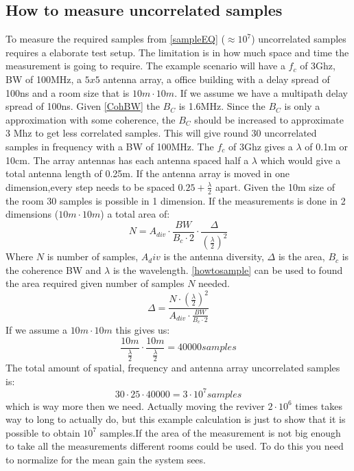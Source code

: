 \subsection{How to measure uncorrelated samples}
To measure the required samples from \autoref{sampleEQ} ($\approx 10^7$) uncorrelated samples requires a elaborate test setup. The limitation is in how much space and time the measurement is going to require. The example scenario  will have a $f_c$ of 3Ghz, BW of 100MHz, a $5x5$ antenna array, a office building with a delay spread of 100ns and a room size that is $10m \cdot 10m$.
If we assume we have a multipath delay spread of 100ns. Given \autoref{CohBW} the $B_C$ is 1.6MHz. Since the $B_C$ is only a approximation with some coherence, the $B_C$ should be increased to approximate 3 Mhz to get less correlated samples. This will give round 30 uncorrelated samples in frequency with a BW of 100MHz.
The $f_c$ of 3Ghz gives a $\lambda$ of 0.1m or 10cm. The array antennas has each antenna spaced half a $\lambda$ which would give a total antenna length of 0.25m. If the antenna array is moved in one dimension,every step needs to be spaced $0.25+\frac{\lambda}{2}$ apart. Given the 10m size of the room 30 samples is possible in 1 dimension. If the measurements is done in 2 dimensions ($10m\cdot 10m$) a total area of:
\begin{equation}
N = A_{div} \cdot \frac{BW}{B_c \cdot 2} \cdot \frac{\Delta}{(\frac{\lambda}{2})^2}
\label{howtosample}
\end{equation} 
Where $N$ is number of samples, $A_div$ is the antenna diversity, $\Delta$ is the area, $B_c$ is the coherence BW and $\lambda$ is the wavelength.
\autoref{howtosample} can be used to found the area required given number of samples $N$ needed.
\begin{equation}
\Delta  = \frac{N\cdot (\frac{\lambda}{2})^2}{A_{div}\cdot \frac{BW}{B_c \cdot 2}}
\label{howtosqaure}
\end{equation}
If we assume a $10m \cdot 10m$ this gives us: 
\begin{equation}
\frac{10m}{\frac{\lambda}{2}} \cdot \frac{10m}{\frac{\lambda}{2}}  = 40000 samples
\end{equation}
The total amount of spatial, frequency and antenna array uncorrelated samples is:
\begin{equation}
30 \cdot 25 \cdot 40000 = 3 \cdot 10^7 samples
\end{equation}
which is way more then we need.
Actually moving the reviver $2 \cdot 10^6$ times takes way to long to actually do, but this example calculation is just to show that it is possible to obtain $10^7$ samples.If the area of the measurement is not big enough to take all the measurements different rooms could be used. To do this you need to normalize for the mean gain the system sees. 

